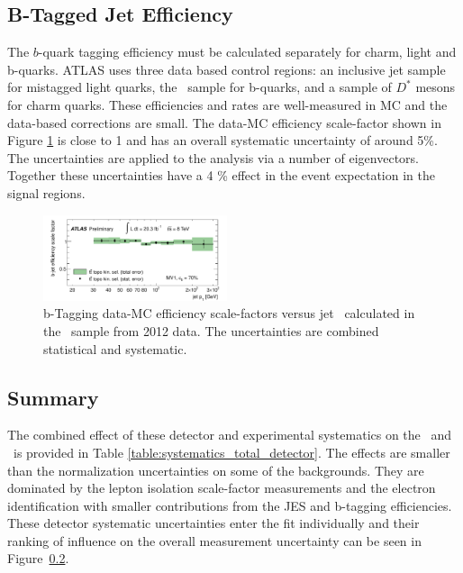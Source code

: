 \subsection{B-Tagged Jet Efficiency}

The $b$-quark tagging efficiency must be calculated separately for charm, light and b-quarks. ATLAS uses three data based control regions: an inclusive jet sample for mistagged light quarks\cite{mistagratecalibration}, the \ttbar\ sample for b-quarks\cite{bjetcalibration}, and a sample of $D^{*}$ mesons for charm quarks\cite{cjetcalibration}. These efficiencies and rates are well-measured in MC and the data-based corrections are small. The data-MC efficiency scale-factor shown in Figure \ref{figure:systematics_b} is close to 1 and has an overall systematic uncertainty of around 5\%. The uncertainties are applied to the analysis via a number of eigenvectors. Together these uncertainties have a 4 \% effect in the event expectation in the signal regions. 

\begin{figure}[htbp]
\begin{center}
\includegraphics[width=0.48\textwidth]{figs/systematics/ttbartopo}
\caption{b-Tagging data-MC efficiency scale-factors versus jet \pt\ calculated in the \ttbar\ sample from 2012 data. The uncertainties are combined statistical and systematic.} 
\label{figure:systematics_b}
\end{center}
\end{figure}


\subsection{Summary}

The combined effect of these detector and experimental systematics on the \ttV\ and \tth\ is provided in Table \ref{table:systematics_total_detector}. The effects are smaller than the normalization uncertainties on some of the backgrounds. They are dominated by the lepton isolation scale-factor measurements and the electron identification with smaller contributions from the JES and b-tagging efficiencies. These detector systematic uncertainties enter the fit individually and their ranking of influence on the overall measurement uncertainty can be seen in Figure~\ref{}.

